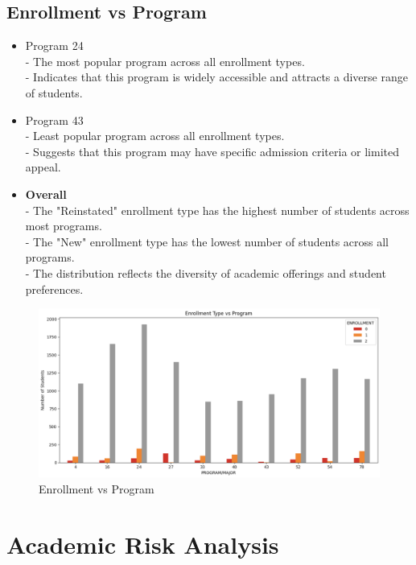 \documentclass[12pt]{article}
\begin{document}
\subsection{Enrollment vs Program}

\begin{itemize}
    \item Program 24\\
    - The most popular program across all enrollment types.\\
    - Indicates that this program is widely accessible and attracts a diverse range of students.

    \item Program 43\\
    - Least popular program across all enrollment types.\\
    - Suggests that this program may have specific admission criteria or limited appeal.
    
    \item \textbf{Overall}\\
    - The "Reinstated" enrollment type has the highest number of students across most programs.\\
    - The "New" enrollment type has the lowest number of students across all programs.\\
    - The distribution reflects the diversity of academic offerings and student preferences.
\end{itemize}

\begin{figure}[H]
    \centering
    \includegraphics[width=1\linewidth]{enrollment.png}
    \caption{Enrollment vs Program}
\end{figure}

\section{Academic Risk Analysis}
\end{document}
